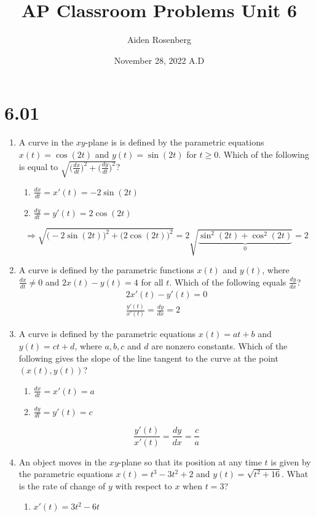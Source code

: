 \documentclass[12pt]{article}
\title{AP Classroom Problems Unit 6}
\author{Aiden Rosenberg}
\date{November 28, 2022 A.D}
\begin{document}
\maketitle
\section*{6.01}
\begin{enumerate}
    \item A curve in the $xy$-plane is is defined by the parametric equations $x(t)=\cos(2t)$ and $y(t)=\sin(2t)$ for $t \geq 0$. Which of the following is equal to $\displaystyle{\sqrt{\bigg(\frac{dx}{dt}\bigg)^2 + \bigg(\frac{dy}{dt}\bigg)^2}}$?
    \begin{enumerate}
        \item $\frac{dx}{dt} = x'(t)=-2\sin(2t)$
        \item $\frac{dy}{dt} = y'(t)=2\cos(2t)$
    \end{enumerate}
    $$\Longrightarrow \sqrt{\big(-2\sin(2t)\big)^2 + \big(2\cos(2t)\big)^2} = 2\sqrt{ \underbrace{\sin^2(2t)+ \cos^2(2t)}_{0}} = \boxed{2}$$
    \item A curve is defined by the parametric functions $x(t)$ and $y(t)$, where $\frac{dx}{dt}\neq 0$ and $2x(t)-y(t)=4$
    for all $t$. Which of the following equals $\frac{dy}{dx}$?
    \begin{align*}
        2x'(t)-y'(t)=0\\
        \frac{y'(t)}{x'(t)} = \frac{dy}{dx} = \boxed{2}
    \end{align*}
    \item A curve is defined by the parametric equations $x(t)=at+b$ and $y(t)=ct+d$, where $a,b,c$ and $d$ are nonzero constants. Which of the following gives the slope of the line tangent to the curve at the point $(x(t),y(t))$?
    \begin{enumerate}
        \item $\frac{dx}{dt} = x'(t) = a$
        \item $\frac{dy}{dt} = y'(t) = c$
    \end{enumerate}
    $$ \frac{y'(t)}{x'(t)} = \frac{dy}{dx} = \boxed{\frac{c}{a}}$$
    \item An object moves in the $xy$-plane so that its position at any time $t$ is given by the parametric equations $x(t) = t^3 - 3t^2 + 2$ and $y(t)=\sqrt{t^2+16}$. What is the rate of change of $y$ with respect to $x$ when $t = 3$?
    \begin{enumerate}
        \item $x'(t) = 3t^2-6t$

\end{enumerate}
\end{enumerate}
\end{document}
